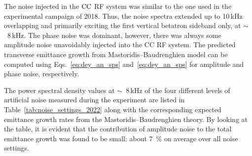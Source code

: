 The noise injected in the ${\mathrm{CC}}$ RF system was similar to the one used in the experimental campaign of 2018. Thus, the noise spectra extended up to 10\,kHz overlapping and primarily exciting the first vertical betatron sideband only, at $\sim$~8\,kHz. The phase noise was dominant, however, there was always some amplitude noise unavoidably injected into the CC RF system. The predicted transverse emittance growth from Mastoridis--Baudrenghien model can be computed using Eqs.~\eqref{eq:dey_an_sps} and~\eqref{eq:dey_an_sps} for amplitude and phase noise, respectively.

The power spectral density values at $\sim$~8\,kHz of the four different levels of artificial noise measured during the experiment are listed in Table~\ref{tab:noise_settings_2022} along with the corresponding expected emittance growth rates from the Mastoridis--Baudrenghien theory. By looking at the table, it is evident that the contribution of amplitude noise to the total emittance growth was found to be small: about 7~$\%$ on average over all noise settings.







